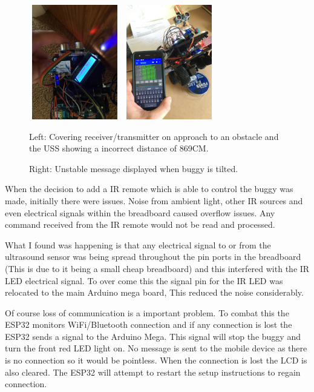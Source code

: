 \documentclass[8pt, a4paper]{article}
\begin{document}
\begin{figure}[H]
	\centering
	\includegraphics[height=5.0cm, width=4.0cm]{cover}
	\includegraphics[height=5.0cm, width=4.0cm]{unstable}
	\caption{Left: Covering receiver/transmitter on approach to an obstacle and the USS showing a incorrect distance of 869CM.}
	\caption{Right: Unstable message displayed when buggy is tilted.}
\end{figure}

 
When the decision to add a IR remote which is able to control the buggy was made, initially there were issues. Noise from ambient light, other IR sources and even electrical signals within the breadboard caused overflow issues. Any command received from the IR remote would not be read and processed. 

What I found was happening is that any electrical signal to or from the ultrasound sensor was being spread throughout the pin ports in the breadboard (This is due to it being a small cheap breadboard) and this interfered with the IR LED electrical signal. To over come this the signal pin for the IR LED was relocated to the main Arduino mega board, This reduced the noise considerably.  


Of course loss of communication is a important problem. To combat this the ESP32 monitors WiFi/Bluetooth connection and if any connection is lost the ESP32 sends a signal to the Arduino Mega. This signal will stop the buggy and turn the front red LED light on. No message is sent to the mobile device as there is no connection so it would be pointless. When the connection is lost the LCD is also cleared. The ESP32 will attempt to restart the setup instructions to regain connection. 
\end{document}
